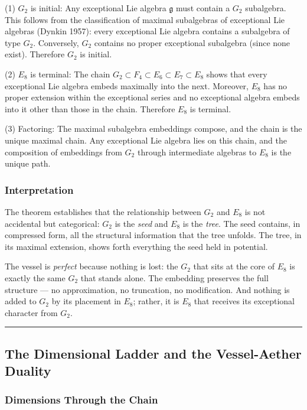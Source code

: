 \documentclass[12pt,a4paper]{article}
\begin{document}
(1) $G_2$ is initial: Any exceptional Lie algebra $\mathfrak{g}$ must contain a $G_2$ subalgebra. This follows from the classification of maximal subalgebras of exceptional Lie algebras (Dynkin 1957): every exceptional Lie algebra contains a subalgebra of type $G_2$. Conversely, $G_2$ contains no proper exceptional subalgebra (since none exist). Therefore $G_2$ is initial.

(2) $E_8$ is terminal: The chain $G_2 \subset F_4 \subset E_6 \subset E_7 \subset E_8$ shows that every exceptional Lie algebra embeds maximally into the next. Moreover, $E_8$ has no proper extension within the exceptional series and no exceptional algebra embeds into it other than those in the chain. Therefore $E_8$ is terminal.

(3) Factoring: The maximal subalgebra embeddings compose, and the chain is the unique maximal chain. Any exceptional Lie algebra lies on this chain, and the composition of embeddings from $G_2$ through intermediate algebras to $E_8$ is the unique path.

\subsubsection{Interpretation}

The theorem establishes that the relationship between $G_2$ and $E_8$ is not accidental but categorical: $G_2$ is the \emph{seed} and $E_8$ is the \emph{tree}. The seed contains, in compressed form, all the structural information that the tree unfolds. The tree, in its maximal extension, shows forth everything the seed held in potential.

The vessel is \emph{perfect} because nothing is lost: the $G_2$ that sits at the core of $E_8$ is exactly the same $G_2$ that stands alone. The embedding preserves the full structure --- no approximation, no truncation, no modification. And nothing is added to $G_2$ by its placement in $E_8$; rather, it is $E_8$ that receives its exceptional character from $G_2$.

\begin{center}
\rule{0.5\textwidth}{0.4pt}
\end{center}

\subsection{The Dimensional Ladder and the Vessel-Aether Duality}

\subsubsection{Dimensions Through the Chain}
\end{document}
